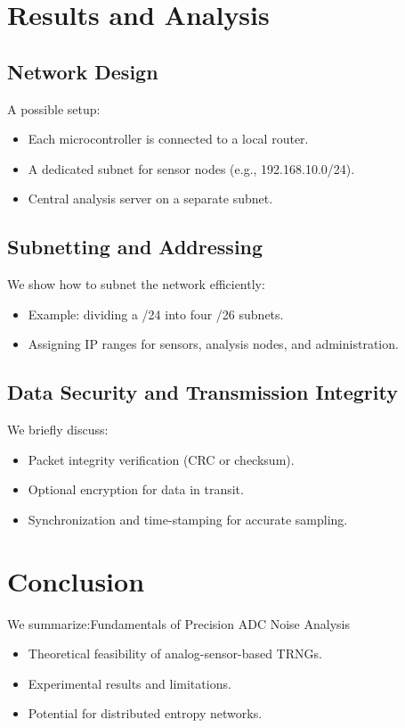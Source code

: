\newpage
\section{Results and Analysis}

\subsection{Network Design}
A possible setup:
\begin{itemize}
    \item Each microcontroller is connected to a local router.
    \item A dedicated subnet for sensor nodes (e.g., 192.168.10.0/24).
    \item Central analysis server on a separate subnet.
\end{itemize}

\subsection{Subnetting and Addressing}
We show how to subnet the network efficiently:
\begin{itemize}
    \item Example: dividing a /24 into four /26 subnets.
    \item Assigning IP ranges for sensors, analysis nodes, and administration.
\end{itemize}

\subsection{Data Security and Transmission Integrity}
We briefly discuss:
\begin{itemize}
    \item Packet integrity verification (CRC or checksum).
    \item Optional encryption for data in transit.
    \item Synchronization and time-stamping for accurate sampling.
\end{itemize}

\newpage
\section{Conclusion}
We summarize:Fundamentals of Precision ADC
Noise Analysis
\begin{itemize}
    \item Theoretical feasibility of analog-sensor-based TRNGs.
    \item Experimental results and limitations.
    \item Potential for distributed entropy networks.
\end{itemize}

